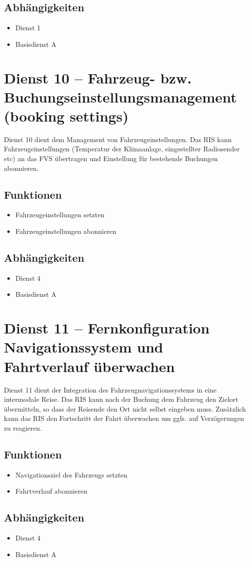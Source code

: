 \subsection*{Abhängigkeiten}
\begin{itemize}
\item Dienst 1
\item Basisdienst A
\end{itemize}


\section{Dienst 10 -- Fahrzeug- bzw. Buchungseinstellungsmanagement (booking settings)}
Dienst 10 dient dem Management von Fahrzeugeinstellungen. Das RIS kann Fahrzeugeinstellungen (Temperatur der Klimaanlage, eingestellter Radiosender etc) an das FVS übertragen und Einstellung für bestehende Buchungen abonnieren.

\subsection*{Funktionen}
\begin{itemize}
\item Fahrzeugeinstellungen setzten
\item Fahrzeugeinstellungen abonnieren
\end{itemize}

\subsection*{Abhängigkeiten}
\begin{itemize}
\item Dienst 4
\item Basisdienst A
\end{itemize}

\section{Dienst 11 -- Fernkonfiguration Navigationssystem und Fahrtverlauf überwachen}
Dienst 11 dient der Integration des Fahrzeugnavigationssystems in eine intermodale Reise. Das RIS kann nach der Buchung dem Fahrzeug den Zielort übermitteln, so dass der Reisende den Ort nicht selbst eingeben muss. Zusätzlich kann das RIS den Fortschritt der Fahrt überwachen um ggfs. auf Verzögerungen zu reagieren.

\subsection*{Funktionen}
\begin{itemize}
\item Navigationsziel des Fahrzeugs setzten
\item Fahrtverlauf abonnieren
\end{itemize}

\subsection*{Abhängigkeiten}
\begin{itemize}
\item Dienst 4
\item Basisdienst A
\end{itemize}
